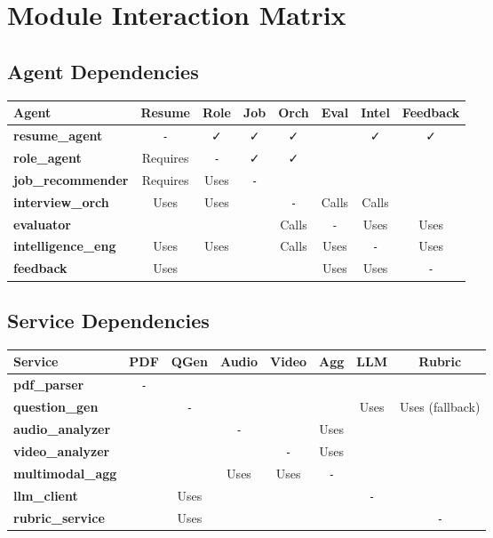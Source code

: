 \documentclass[11pt]{article}
\begin{document}
\newpage

\section{Module Interaction Matrix}

\subsection{Agent Dependencies}

\begin{center}
\begin{tabular}{|l|c|c|c|c|c|c|c|}
\hline
\textbf{Agent} & \textbf{Resume} & \textbf{Role} & \textbf{Job} & \textbf{Orch} & \textbf{Eval} & \textbf{Intel} & \textbf{Feedback} \\
\hline
\textbf{resume\_agent} & \texttt{-} & ✓ & ✓ & ✓ & & ✓ & ✓ \\
\hline
\textbf{role\_agent} & Requires & \texttt{-} & ✓ & ✓ & & & \\
\hline
\textbf{job\_recommender} & Requires & Uses & \texttt{-} & & & & \\
\hline
\textbf{interview\_orch} & Uses & Uses & & \texttt{-} & Calls & Calls & \\
\hline
\textbf{evaluator} & & & & Calls & \texttt{-} & Uses & Uses \\
\hline
\textbf{intelligence\_eng} & Uses & Uses & & Calls & Uses & \texttt{-} & Uses \\
\hline
\textbf{feedback} & Uses & & & & Uses & Uses & \texttt{-} \\
\hline
\end{tabular}
\end{center}

\subsection{Service Dependencies}

\begin{center}
\begin{tabular}{|l|c|c|c|c|c|c|c|}
\hline
\textbf{Service} & \textbf{PDF} & \textbf{QGen} & \textbf{Audio} & \textbf{Video} & \textbf{Agg} & \textbf{LLM} & \textbf{Rubric} \\
\hline
\textbf{pdf\_parser} & \texttt{-} & & & & & & \\
\hline
\textbf{question\_gen} & & \texttt{-} & & & & Uses & Uses (fallback) \\
\hline
\textbf{audio\_analyzer} & & & \texttt{-} & & Uses & & \\
\hline
\textbf{video\_analyzer} & & & & \texttt{-} & Uses & & \\
\hline
\textbf{multimodal\_agg} & & & Uses & Uses & \texttt{-} & & \\
\hline
\textbf{llm\_client} & & Uses & & & & \texttt{-} & \\
\hline
\textbf{rubric\_service} & & Uses & & & & & \texttt{-} \\
\hline
\end{tabular}
\end{center}
\end{document}
